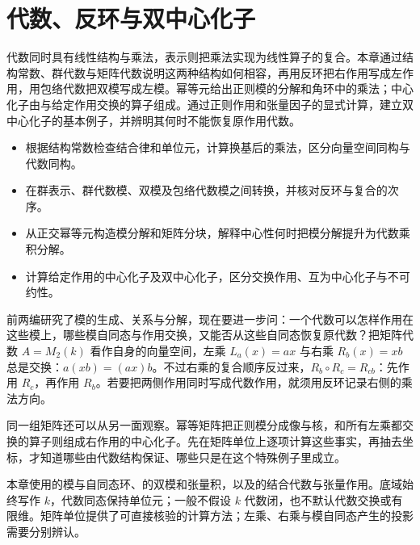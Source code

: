 
\chapter{代数、反环与双中心化子}
\label{b2:ch:11}

\begin{chapterabstract}
	代数同时具有线性结构与乘法，表示则把乘法实现为线性算子的复合。本章通过结构常数、群代数与矩阵代数说明这两种结构如何相容，再用反环把右作用写成左作用，用包络代数把双模写成左模。幂等元给出正则模的分解和角环中的乘法；中心化子由与给定作用交换的算子组成。通过正则作用和张量因子的显式计算，建立双中心化子的基本例子，并辨明其何时不能恢复原作用代数。
\end{chapterabstract}

\begin{learninggoals}
	\begin{itemize}
		\item 根据结构常数检查结合律和单位元，计算换基后的乘法，区分向量空间同构与代数同构。
		\item 在群表示、群代数模、双模及包络代数模之间转换，并核对反环与复合的次序。
		\item 从正交幂等元构造模分解和矩阵分块，解释中心性何时把模分解提升为代数乘积分解。
		\item 计算给定作用的中心化子及双中心化子，区分交换作用、互为中心化子与不可约性。
	\end{itemize}
\end{learninggoals}

前两编研究了模的生成、关系与分解，现在要进一步问：一个代数可以怎样作用在这些模上，哪些模自同态与作用交换，又能否从这些自同态恢复原代数？把矩阵代数 \(A=M_2(k)\) 看作自身的向量空间，左乘 \(L_a(x)=ax\) 与右乘 \(R_b(x)=xb\) 总是交换：\(a(xb)=(ax)b\)。不过右乘的复合顺序反过来，\(R_b\circ R_c=R_{cb}\)：先作用 \(R_c\)，再作用 \(R_b\)。若要把两侧作用同时写成代数作用，就须用反环记录右侧的乘法方向。

\ProseParagraphBreak

同一组矩阵还可以从另一面观察。幂等矩阵把正则模分成像与核，和所有左乘都交换的算子则组成右作用的中心化子。先在矩阵单位上逐项计算这些事实，再抽去坐标，才知道哪些由代数结构保证、哪些只是在这个特殊例子里成立。

\ProseParagraphBreak

本章使用的模与自同态环、的双模和张量积，以及的结合代数与张量作用。底域始终写作 \(k\)，代数同态保持单位元；一般不假设 \(k\) 代数闭，也不默认代数交换或有限维。矩阵单位提供了可直接核验的计算方法；左乘、右乘与模自同态产生的投影需要分别辨认。

